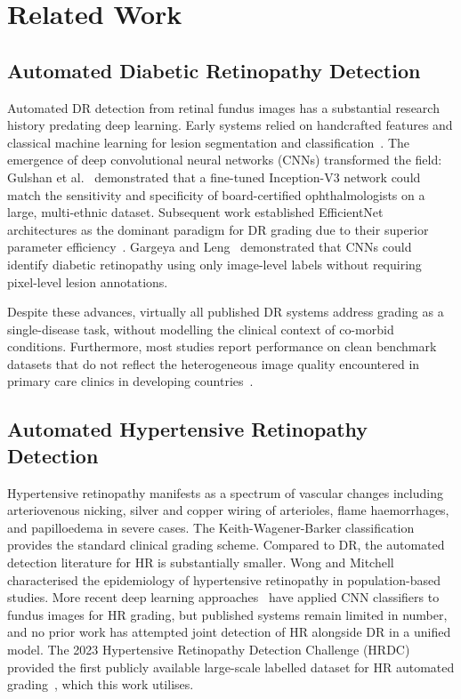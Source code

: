 \documentclass[review,12pt]{elsarticle}
\begin{document}
\section{Related Work}
\label{sec:related}

\subsection{Automated Diabetic Retinopathy Detection}

Automated DR detection from retinal fundus images has a substantial research
history predating deep learning. Early systems relied on handcrafted features
and classical machine learning for lesion segmentation and
classification~\cite{niemeijer2007}. The emergence of deep convolutional neural
networks (CNNs) transformed the field: Gulshan et al.~\cite{gulshan2016}
demonstrated that a fine-tuned Inception-V3 network could match the sensitivity
and specificity of board-certified ophthalmologists on a large, multi-ethnic
dataset. Subsequent work established EfficientNet architectures as the
dominant paradigm for DR grading due to their superior parameter
efficiency~\cite{tan2019}. Gargeya and Leng~\cite{gargeya2017} demonstrated
that CNNs could identify diabetic retinopathy using only image-level labels
without requiring pixel-level lesion annotations.

Despite these advances, virtually all published DR systems address grading as
a single-disease task, without modelling the clinical context of co-morbid
conditions. Furthermore, most studies report performance on clean benchmark
datasets that do not reflect the heterogeneous image quality encountered in
primary care clinics in developing countries~\cite{raman2019}.

\subsection{Automated Hypertensive Retinopathy Detection}

Hypertensive retinopathy manifests as a spectrum of vascular changes including
arteriovenous nicking, silver and copper wiring of arterioles, flame
haemorrhages, and papilloedema in severe cases. The Keith-Wagener-Barker
classification~\cite{kwb1939} provides the standard clinical grading scheme.
Compared to DR, the automated detection literature for HR is substantially
smaller. Wong and Mitchell~\cite{wong2004} characterised the epidemiology of
hypertensive retinopathy in population-based studies. More recent deep learning
approaches~\cite{dai2021} have applied CNN classifiers to fundus images for
HR grading, but published systems remain limited in number, and no prior work
has attempted joint detection of HR alongside DR in a unified model.
The 2023 Hypertensive Retinopathy Detection Challenge (HRDC) provided the
first publicly available large-scale labelled dataset for HR automated
grading~\cite{hrdc2023}, which this work utilises.
\end{document}
